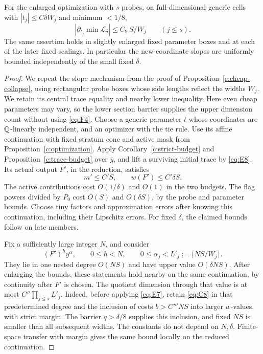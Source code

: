 \begin{proposition}
\label{c:layer-slopes}
For the enlarged optimization with \(s\) probes, on
full-dimensional generic cells with
\(|t_j|\le C\delta W_j\) and minimum \(<1/8\),
\begin{equation}\label{eq:G3}
       \left|\partial_{t_j}\min\mathcal L_\delta\right|
                            \le C_9\,S/W_j
                            \qquad(j\le s).
\end{equation}
The same assertion holds in slightly enlarged fixed
parameter boxes and at each of the later fixed scalings.
In particular the new-coordinate slopes are uniformly
bounded independently of the small fixed \(\delta\).
\end{proposition}

\begin{proof}
We repeat the slope mechanism from the proof of
Proposition~\ref{c:cheap-collapse}, using rectangular probe boxes
whose side lengths reflect the widths
\(W_j\).  We retain its central trace equality and nearby lower
inequality.  Here even cheap parameters may vary, so the lower section
barrier supplies the upper dimension count without using
\eqref{eq:F4}.
Choose a generic parameter \(t\)
whose coordinates are \(\mathbb Q\)-linearly independent, and
an optimizer with the tie rule.  Use its affine
continuation with fixed stratum cone and active mask
from Proposition~\ref{c:optimization}.
Apply Corollary~\ref{c:strict-budget} and
Proposition~\ref{c:trace-budget} over
\(\overline y\), and lift a surviving initial trace
by \eqref{eq:E8}.  Its actual output \(F'\), in the
reduction, satisfies
\[
                         m'\le C'S,\qquad
                         w(F')\le C'\delta S.
\]
The active contributions cost \(O(1/\delta)\) and
\(O(1)\) in the two budgets.  The flag powers divided
by \(P_0\) cost \(O(S)\) and \(O(\delta S)\), by
the probe and parameter bounds.  Choose tiny factors
and approximation errors after knowing this continuation,
including their Lipschitz errors.  For fixed \(\delta\),
the claimed bounds follow on late members.

Fix a sufficiently large integer \(N\), and consider
\[
       (F')^h y^\alpha,\qquad
       0\le h<N,\qquad
       0\le\alpha_j<L'_j:=\lceil NS/W_j\rceil.
\]
They lie in one nested degree \(O(NS)\) and have
upper value \(O(\delta NS)\).  After enlarging the
bounds, these statements hold nearby on the same
continuation, by continuity after \(F'\) is chosen.
The quotient dimension through that value is at most
\(C''\prod_{j\le s}L'_j\).
Indeed, before applying \eqref{eq:E7}, retain
\eqref{eq:C8} in that predetermined degree and
the inclusion of costs \(b>C'''NS\) into larger
\(w\)-values, with strict margin.  The barrier
\(q>\delta/8\) supplies this inclusion, and fixed
\(NS\) is smaller than all subsequent widths.
The constants do not depend on \(N,\delta\).
Finite-space transfer with margin gives the same
bound locally on the reduced continuation.


\end{proof}
